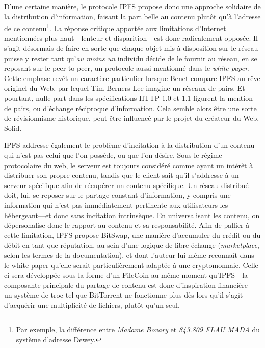 \documentclass{article}
\begin{document}
D'une certaine manière, le protocole IPFS propose donc une approche solidaire de la distribution d'information, faisant la part belle au contenu plutôt qu'à l'adresse de ce contenu\footnote{Par exemple, la différence entre \emph{Madame Bovary} et \emph{843.809 FLAU MADA} du système d'adresse Dewey.}. La réponse critique apportée aux limitations d'Internet mentionnées plus haut—lenteur et disparition—est donc radicalement opposée. Il s'agit désormais de faire en sorte que chaque objet mis à disposition sur le réseau puisse y rester tant qu'\emph{au moins un} individu décide de le fournir au réseau, en se reposant sur le peer-to-peer, un protocole aussi mentionné dans le \emph{white paper}. Cette emphase revêt un caractère particulier lorsque Benet compare IPFS au rêve originel du Web, par lequel Tim Berners-Lee imagine un réseaux de pairs\cite{protocol_labs_history_nodate}. Et pourtant, nulle part dans les spécifications HTTP 1.0 et 1.1 figurent la mention de pairs, ou d'échange réciproque d'information. Cela semble alors être une sorte de révisionnisme historique, peut-être influencé par le projet du créateur du Web, Solid\cite{berners-lee_one_2018}. 

IPFS addresse également le problème d'incitation à la distribution d'un contenu qui n'est pas celui que l'on possède, ou que l'on désire. Sous le régime protocolaire du web, le serveur est toujours considéré comme ayant un intérêt à distribuer son propre contenu, tandis que le client sait qu'il s'addresse à un serveur spécifique afin de récupérer un contenu spécifique. Un réseau distribué doit, lui, se reposer sur le partage constant d'information, y compris une information qui n'est pas immédiatement pertinente aux utilisateurs les hébergeant—et donc sans incitation intrinsèque. En universalisant les contenu, on dépersonalise donc le rapport au contenu et sa responsabilité. Afin de pallier à cette limitation, IPFS propose BitSwap, une manière d'accumuler du crédit ou du débit en tant que réputation, au sein d'une logique de libre-échange (\emph{marketplace}, selon les termes de la documentation\cite{protocol_labs_bitswap_2019}), et dont l'auteur lui-même reconnaît dans le white paper qu'elle serait particulièrement adaptée à une cryptomonnaie. Celle-ci sera développée sous la forme d'un FileCoin au même moment qu'IPFS\cite{protocol_labs_filecoin_2014}—la composante principale du partage de contenu est donc d'inspiration financière—un système de troc tel que BitTorrent ne fonctionne plus dès lors qu'il s'agit d'acquérir une multiplicité de fichiers, plutôt qu'un seul.
\end{document}
